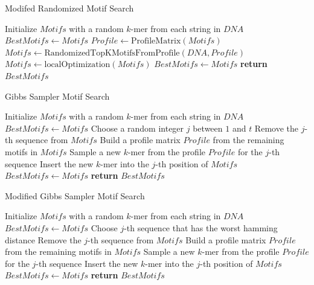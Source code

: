 \documentclass{article}
\begin{document}
\begin{algorithm}
  \caption{Modifed Randomized Motif Search}
  \begin{algorithmic}[1]
      \State Initialize $Motifs$ with a random $k$-mer from each string in $DNA$
      \State $BestMotifs \gets Motifs$
        \State $Profile \gets \text{ProfileMatrix}(Motifs)$
        \State $Motifs \gets \text{RandomizedTopKMotifsFromProfile}(DNA, Profile)$
        \State $Motifs \gets \text{localOptimization}(Motifs)$
          \State $BestMotifs \gets Motifs$
        \Else
          \State \textbf{return} $BestMotifs$
        \EndIf
      \EndWhile
    \EndFunction
  \end{algorithmic}
\end{algorithm}

\begin{algorithm}
  \caption{Gibbs Sampler Motif Search}
  \begin{algorithmic}[1]
      \State Initialize $Motifs$ with a random $k$-mer from each string in $DNA$
      \State $BestMotifs \gets Motifs$
        \State Choose a random integer $j$ between $1$ and $t$
        \State Remove the $j$-th sequence from $Motifs$
        \State Build a profile matrix $Profile$ from the remaining motifs in $Motifs$
        \State Sample a new $k$-mer from the profile $Profile$ for the $j$-th sequence
        \State Insert the new $k$-mer into the $j$-th position of $Motifs$
          \State $BestMotifs \gets Motifs$
        \EndIf
      \EndFor
      \State \textbf{return} $BestMotifs$
    \EndFunction
  \end{algorithmic}
\end{algorithm}

\begin{algorithm}
  \caption{Modified Gibbs Sampler Motif Search}
  \begin{algorithmic}[1]
      \State Initialize $Motifs$ with a random $k$-mer from each string in $DNA$
      \State $BestMotifs \gets Motifs$
        \State Choose $j$-th sequence that has the worst hamming distance
        \State Remove the $j$-th sequence from $Motifs$
        \State Build a profile matrix $Profile$ from the remaining motifs in $Motifs$
        \State Sample a new $k$-mer from the profile $Profile$ for the $j$-th sequence
        \State Insert the new $k$-mer into the $j$-th position of $Motifs$
          \State $BestMotifs \gets Motifs$
        \EndIf
      \EndFor
      \State \textbf{return} $BestMotifs$
    \EndFunction
  \end{algorithmic}
\end{algorithm}
\end{document}
